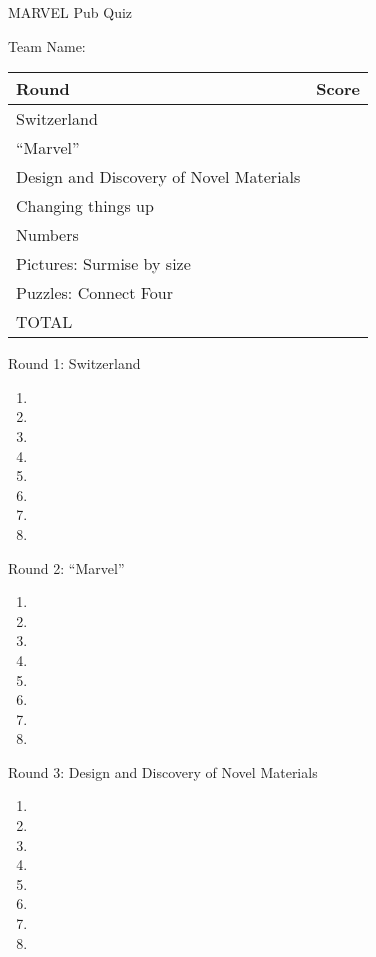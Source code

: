 

\centering
\Huge
MARVEL Pub Quiz
\vspace{2cm}

\LARGE
Team Name: \underline{\hphantom{XXXXXXXXXXXXXXXXXXXXXXXXXX}}

\vspace{3cm}

\LARGE
\begin{tabular}{ll}
\hline
Round & Score \\
\hline
Switzerland & \\
``Marvel'' & \\
Design and Discovery of Novel Materials & \\
Changing things up & \\
Numbers & \\
Pictures: Surmise by size & \\
Puzzles: Connect Four & \\
TOTAL \\
\hline
\end{tabular}
\thispagestyle{empty}
\Huge
\newpage
\begin{center}
\Huge
Round 1: Switzerland
\end{center}
\large
\Huge
\begin{enumerate}
\item
\item
\item
\item
\item
\item
\item
\item
\end{enumerate}

\newpage
\begin{center}
\Huge
Round 2: ``Marvel''
\end{center}
\large
\Huge
\begin{enumerate}
\item
\item
\item
\item
\item
\item
\item
\item
\end{enumerate}

\newpage
\begin{center}
\Huge
Round 3: Design and Discovery of Novel Materials
\end{center}
\large
\Huge
\begin{enumerate}
\item
\item
\item
\item
\item
\item
\item
\item
\end{enumerate}

